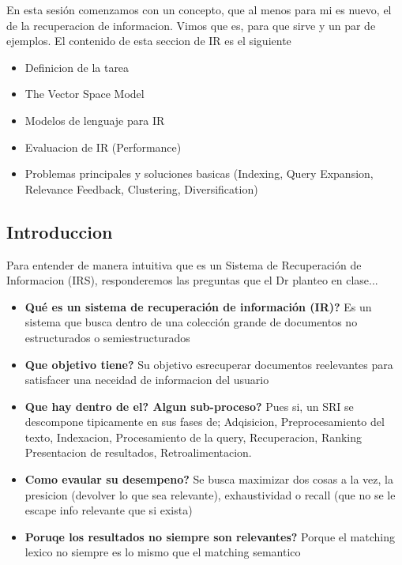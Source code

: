 \documentclass[11pt,letterpaper]{article}
\begin{document}


\begin{quick_sum}
    En esta sesión comenzamos con un concepto, que al menos para mi es nuevo, el de la
    recuperacion de informacion. Vimos que es, para que sirve y un par de ejemplos.
    El contenido de esta seccion de IR es el siguiente
    \begin{itemize}
        \item Definicion de la tarea
        \item The Vector Space Model
        \item Modelos de lenguaje para IR
        \item Evaluacion de IR (Performance)
        \item Problemas principales y soluciones basicas (Indexing, Query Expansion, Relevance Feedback, Clustering, Diversification)
    \end{itemize}
\end{quick_sum}

\subsection*{Introduccion}

Para entender de manera intuitiva que es un Sistema de Recuperación de Informacion (IRS), responderemos las preguntas que el Dr planteo en clase...

\begin{itemize}
    \item \textbf{Qué es un sistema de recuperación de información (IR)?} Es un sistema que busca dentro de una colección grande de documentos no estructurados o semiestructurados
    \item \textbf{Que objetivo tiene?} Su objetivo esrecuperar documentos reelevantes para satisfacer una neceidad de informacion del usuario
    \item \textbf{Que hay dentro de el? Algun sub-proceso?} Pues si, un SRI se descompone tipicamente en sus fases de; Adqisicion, Preprocesamiento del texto, Indexacion, Procesamiento de la query, Recuperacion, Ranking Presentacion de resultados, Retroalimentacion.
    \item \textbf{Como evaular su desempeno?} Se busca maximizar dos cosas a la vez, la presicion (devolver lo que sea relevante), exhaustividad o recall (que no se le escape info relevante que si exista)
    \item \textbf{Poruqe los resultados no siempre son relevantes?} Porque el matching lexico no siempre es lo mismo que el matching semantico
\end{itemize}
\end{document}
